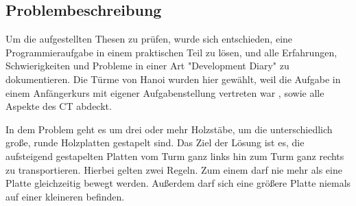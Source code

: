 \subsection{Problembeschreibung}\label{sec:problemdesc}
Um die aufgestellten Thesen zu prüfen, wurde sich entschieden, eine Programmieraufgabe in einem praktischen Teil zu lösen, und alle Erfahrungen, Schwierigkeiten und Probleme in einer Art "Development Diary" zu dokumentieren.
Die Türme von Hanoi wurden hier gewählt, weil die Aufgabe in einem Anfängerkurs mit eigener Aufgabenstellung vertreten war \cite{cis194}, sowie alle Aspekte des CT abdeckt.

In dem Problem geht es um drei oder mehr Holzstäbe, um die unterschiedlich große, runde Holzplatten gestapelt sind. Das Ziel der Lösung ist es, die aufsteigend gestapelten Platten vom Turm ganz links hin zum Turm ganz rechts zu transportieren. Hierbei gelten zwei Regeln. Zum einem darf nie mehr als eine Platte gleichzeitig bewegt werden. Außerdem darf sich eine größere Platte niemals auf einer kleineren befinden.

